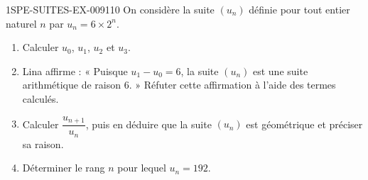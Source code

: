 \begin{exercice}{1SPE-SUITES-EX-009}{1}{10}
On considère la suite $(u_n)$ définie pour tout entier naturel $n$ par
$u_n = 6 \times 2^n$.
\begin{enumerate}
  \item Calculer $u_0$, $u_1$, $u_2$ et $u_3$.
  \item Lina affirme : « Puisque $u_1-u_0=6$, la suite $(u_n)$ est une suite
  arithmétique de raison $6$. » Réfuter cette affirmation à l'aide des termes
  calculés.
  \item Calculer $\dfrac{u_{n+1}}{u_n}$, puis en déduire que la suite $(u_n)$
  est géométrique et préciser sa raison.
  \item Déterminer le rang $n$ pour lequel $u_n=192$.
\end{enumerate}
\end{exercice}
